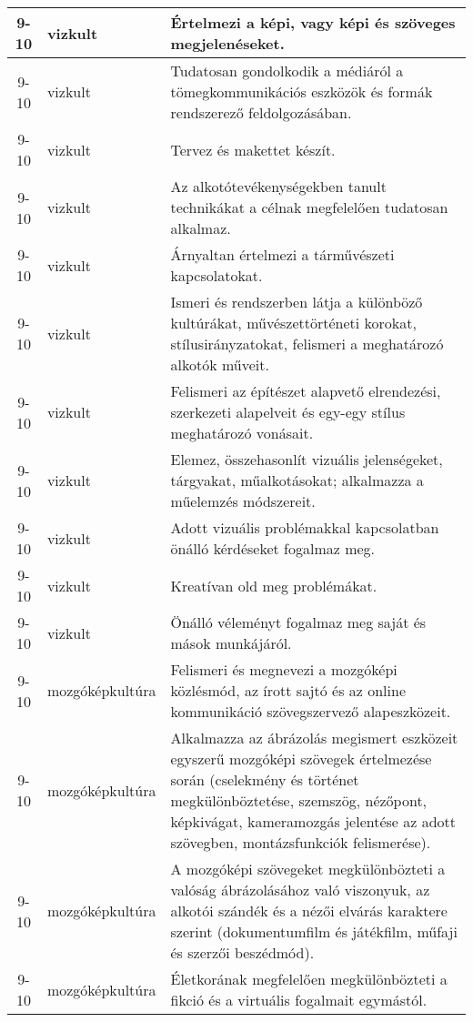 \begin{small}
\begin{longtable}{c | p{2cm} |  p{11cm} }
              9-10 & vizkult & Értelmezi a képi, vagy képi és szöveges megjelenéseket. \\ \hline
              9-10 & vizkult & Tudatosan gondolkodik a médiáról a tömegkommunikációs eszközök és formák rendszerező feldolgozásában. \\ \hline
              9-10 & vizkult & Tervez és makettet készít. \\ \hline
              9-10 & vizkult & Az alkotótevékenységekben tanult technikákat a célnak megfelelően tudatosan alkalmaz. \\ \hline
              9-10 & vizkult & Árnyaltan értelmezi a tárművészeti kapcsolatokat. \\ \hline
              9-10 & vizkult & Ismeri és rendszerben látja a különböző kultúrákat, művészettörténeti korokat, stílusirányzatokat, felismeri a meghatározó alkotók műveit. \\ \hline
              9-10 & vizkult & Felismeri az építészet alapvető elrendezési, szerkezeti alapelveit és egy-egy stílus meghatározó vonásait. \\ \hline
              9-10 & vizkult & Elemez, összehasonlít vizuális jelenségeket, tárgyakat, műalkotásokat; alkalmazza a műelemzés módszereit. \\ \hline
              9-10 & vizkult & Adott vizuális problémakkal kapcsolatban önálló kérdéseket fogalmaz meg. \\ \hline
              9-10 & vizkult & Kreatívan old meg problémákat. \\ \hline
              9-10 & vizkult & Önálló véleményt fogalmaz meg saját és mások munkájáról. \\ \hline
              9-10 & mozgóképkultúra & Felismeri és megnevezi a mozgóképi közlésmód, az írott sajtó és az online kommunikáció szövegszervező alapeszközeit. \\ \hline
              9-10 & mozgóképkultúra & Alkalmazza az ábrázolás megismert eszközeit egyszerű mozgóképi szövegek értelmezése során (cselekmény és történet megkülönböztetése, szemszög, nézőpont, képkivágat, kameramozgás jelentése az adott szövegben, montázsfunkciók felismerése). \\ \hline
              9-10 & mozgóképkultúra & A mozgóképi szövegeket megkülönbözteti a valóság ábrázolásához való viszonyuk, az alkotói szándék és a nézői elvárás karaktere szerint (dokumentumfilm és játékfilm, műfaji és szerzői beszédmód). \\ \hline
              9-10 & mozgóképkultúra & Életkorának megfelelően megkülönbözteti a fikció és a virtuális fogalmait egymástól.  \\ \hline

\end{longtable}
\end{small}
